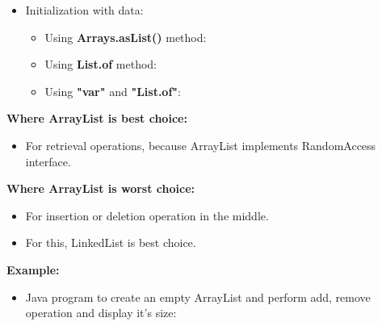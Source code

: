 \begin{flushleft}
\begin{itemize}
		\newpage
		\item Initialization with data:
		\begin{itemize}
			\item Using \textbf{Arrays.asList()} method:
			\bigskip
			
			\item Using \textbf{List.of} method:
			\bigskip
			
			\item Using \textbf{"var"} and \textbf{"List.of"}: 
			\bigskip
			
		\end{itemize}
	
	\end{itemize}

	\textbf{Where ArrayList is best choice:}
	\begin{itemize}
		\item For retrieval operations, because ArrayList implements RandomAccess interface.
	\end{itemize}
	
	\textbf{Where ArrayList is worst choice:}
	\begin{itemize}
		\item For insertion or deletion operation in the middle.
		\item For this, LinkedList is best choice.
	\end{itemize}
	
		
	\newpage
	
	\textbf{Example:}
	
	\begin{itemize}
		\item Java program to create an empty ArrayList and perform add, remove operation and display it's size:
		

\end{itemize}
\end{flushleft}
